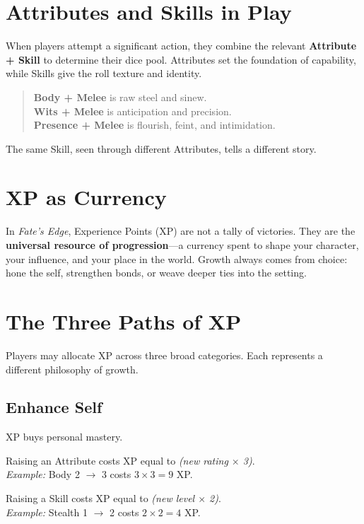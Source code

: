\documentclass[12pt]{article}
\begin{document}
\section{Attributes and Skills in Play}
When players attempt a significant action, they combine the relevant \textbf{Attribute + Skill} to determine their dice pool. Attributes set the foundation of capability, while Skills give the roll texture and identity.
\begin{quote}
\textbf{Body + Melee} is raw steel and sinew.\\
\textbf{Wits + Melee} is anticipation and precision.\\
\textbf{Presence + Melee} is flourish, feint, and intimidation.
\end{quote}
The same Skill, seen through different Attributes, tells a different story.

\section{XP as Currency}
In \textit{Fate’s Edge}, Experience Points (XP) are not a tally of victories. They are the \textbf{universal resource of progression}—a currency spent to shape your character, your influence, and your place in the world. Growth always comes from choice: hone the self, strengthen bonds, or weave deeper ties into the setting.

\section{The Three Paths of XP}
Players may allocate XP across three broad categories. Each represents a different philosophy of growth.

\subsection{Enhance Self}
XP buys personal mastery.
\begin{description}[leftmargin=2cm]
  \item[Attributes] Raising an Attribute costs XP equal to \emph{(new rating $\times$ 3)}.\\
  \emph{Example:} Body 2 $\rightarrow$ 3 costs $3\times 3=9$ XP.
  \item[Skills] Raising a Skill costs XP equal to \emph{(new level $\times$ 2)}.\\
  \emph{Example:} Stealth 1 $\rightarrow$ 2 costs $2\times 2=4$ XP.
\end{description}
\end{document}
